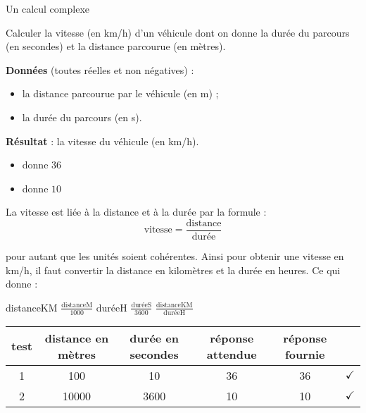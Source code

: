 \begin{Fiche}{Un calcul complexe}
\label{fiche:calcul-complexe}

	Calculer la vitesse (en km/h) d'un véhicule dont on donne
	la durée du parcours (en secondes) 
	et la distance parcourue (en mètres).

	
	\textbf{Données} (toutes réelles et non négatives) :
		\begin{itemize}
		\item la distance parcourue par le véhicule (en m) ;
		\item la durée du parcours (en s).
		\end{itemize}
		
	\textbf{Résultat} : la vitesse du véhicule (en km/h).

	\begin{center}
	\end{center}


	\begin{itemize}
	\item {} donne $36$
	\item {} donne $10$
	\end{itemize}


	La vitesse est liée à la distance et à la durée par la formule :
	\[
		\textrm{vitesse} = \frac{\textrm{distance}}{\textrm{durée}}
	\]

	pour autant que les unités soient cohérentes.
	Ainsi pour obtenir une vitesse en km/h, 
	il faut convertir la distance en kilomètres 
	et la durée en heures.
	Ce qui donne :
		
	\begin{LDA}
			\Let distanceKM \Gets $\frac{\textrm{distanceM}}{1000}$
			\Let duréeH \Gets $\frac{\textrm{duréeS}}{3600}$
			\Return $\frac{\textrm{distanceKM}}{\textrm{duréeH}}$
		\EndAlgo
	\end{LDA}


	\begin{center}
		\begin{tabular}{|c|cccc|c|}
		\hline
		test \no & distance en mètres & durée en secondes & réponse attendue & réponse fournie & {} \\\hline
		\hline 
		1 & 100   & 10   & 36 & 36 & {\color{ForestGreen}$\checkmark$} \\\hline
		2 & 10000 & 3600 & 10 & 10 & {\color{ForestGreen}$\checkmark$} \\\hline
		\end{tabular}
	\end{center}								


\end{Fiche}
